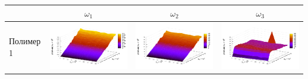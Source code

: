\documentclass[11pt,a4paper]{article}
\theoremstyle{definition}
\begin{document}
\begin{table}[h]
  \centering
  \footnotesize
  \begin{tabular}{l | c c c}
	  & $\omega_1$ & $\omega_2$ & $\omega_3$ \\ \hline
	\begin{rotate}{90}Полимер 1\end{rotate} &	\includegraphics[scale=0.4]{figs/all/p1.txt_coeff0.dat.pdf} & \includegraphics[scale=0.4]{figs/all/p1.txt_coeff1.dat.pdf} & \includegraphics[scale=0.4]{figs/all/p1.txt_coeff2.dat.pdf} \\

\end{tabular}
\end{table}
\end{document}
